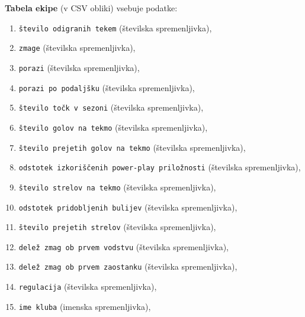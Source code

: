 \documentclass[11pt,a4paper]{article}
\begin{document}
\textbf{Tabela ekipe} (v CSV obliki) vsebuje podatke:
\begin{enumerate}
\item{\verb|število odigranih tekem| (številska spremenljivka),}
\item{\verb|zmage| (številska spremenljivka),}
\item{\verb|porazi| (številska spremenljivka),}
\item{\verb|porazi po podaljšku| (številska spremenljivka),}
\item{\verb|število točk v sezoni| (številska spremenljivka),}
\item{\verb|število golov na tekmo| (številska spremenljivka),}
\item{\verb|število prejetih golov na tekmo| (številska spremenljivka),}
\item{\verb|odstotek izkoriščenih power-play priložnosti| (številska spremenljivka),}
\item{\verb|število strelov na tekmo| (številska spremenljivka),}
\item{\verb|odstotek pridobljenih bulijev| (številska spremenljivka),}
\item{\verb|število prejetih strelov| (številska spremenljivka),}
\item{\verb|delež zmag ob prvem vodstvu| (številska spremenljivka),}
\item{\verb|delež zmag ob prvem zaostanku| (številska spremenljivka),}
\item{\verb|regulacija| (številska spremenljivka),}
\item{\verb|ime kluba| (imenska spremenljivka),}
\end{enumerate}
\end{document}
